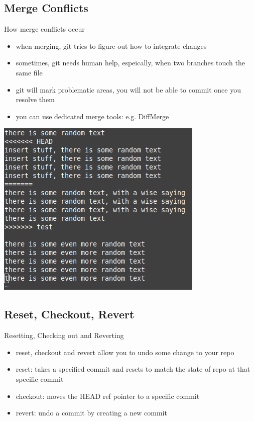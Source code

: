 \documentclass[12pt]{beamer}
\begin{document}
\subsection{Merge Conflicts}
\begin{frame}{How merge conflicts occur}
\begin{itemize}
	\item when merging, git tries to figure out how to integrate changes
	\item sometimes, git needs human help, espeically, when two branches touch the same file
	\item git will mark problematic areas, you will not be able to commit once you resolve them
	\item you can use dedicated merge tools: e.g. DiffMerge
\end{itemize}
\begin{center}
	\includegraphics[width=0.5\linewidth]{conflict_file}
\end{center}
\end{frame}
\subsection{Reset, Checkout, Revert}
\begin{frame}{Resetting, Checking out and Reverting}
\begin{itemize}
	\item reset, checkout and revert allow you to undo some change to your repo
	\item reset: takes a specified commit and resets to match the state of repo at that specific commit
	\item checkout: moves the HEAD ref pointer to a specific commit 
	\item revert: undo a commit by creating a new commit
\end{itemize}
\end{frame}
\end{document}
